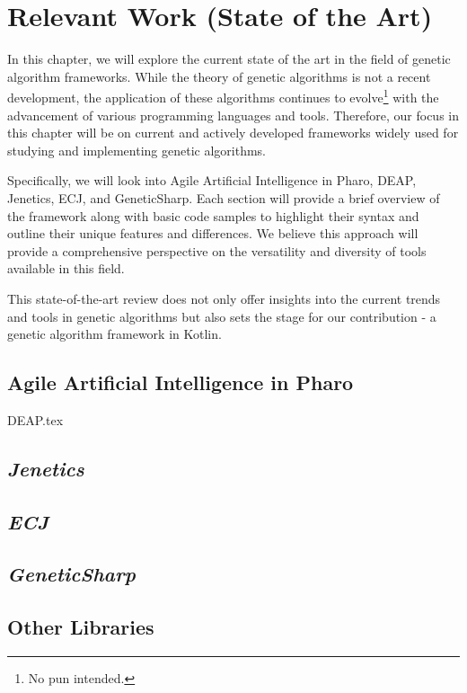 \chapter{Relevant Work (State of the Art)}
\label{chap:sota}

  In this chapter, we will explore the current state of the art in the field of
  genetic algorithm frameworks.
  While the theory of genetic algorithms is not a recent development, the
  application of these algorithms continues to evolve\footnote{No pun intended.}
  with the advancement of various programming languages and tools.
  Therefore, our focus in this chapter will be on current and actively developed
  frameworks widely used for studying and implementing genetic algorithms.

  Specifically, we will look into Agile Artificial Intelligence in Pharo, DEAP,
  Jenetics, ECJ, and GeneticSharp.
  Each section will provide a brief overview of the framework along with basic
  code samples to highlight their syntax and outline their unique features and
  differences.
  We believe this approach will provide a comprehensive perspective on the
  versatility and diversity of tools available in this field.

  This state-of-the-art review does not only offer insights into the current
  trends and tools in genetic algorithms but also sets the stage for our
  contribution - a genetic algorithm framework in Kotlin.

  \section{Agile Artificial Intelligence in Pharo}
  \label{sec:sota:pharo}
    \Blindtext
  {DEAP.tex}
  \section{\textit{Jenetics}}
  \label{sec:sota:jenetics}
    \Blindtext
  \section{\textit{ECJ}}
  \label{sec:sota:ecj}
    \Blindtext
  \section{\textit{GeneticSharp}}
  \label{sec:sota:geneticsharp}
    \Blindtext
  \section{Other Libraries}
  \label{sec:sota:other}
    \Blindtext
